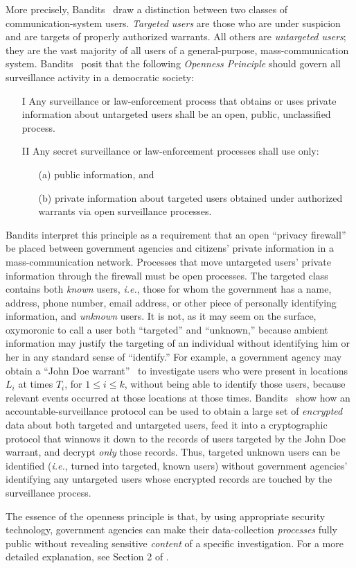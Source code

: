 More precisely, Bandits~\cite{sff-foci2014} draw a distinction 
between two classes of communication-system users.  {\it Targeted users} are 
those who are under suspicion and are targets of properly authorized warrants.
All others are {\it untargeted users}; they are the vast majority of all 
users of a general-purpose, mass-communication system. Bandits~\cite{sff-foci2014}
posit that the following {\it Openness Principle} should govern all surveillance
activity in a democratic society:
\begin{enumerate}
\item[I]
Any surveillance or law-enforcement process
that obtains or uses private information
about untargeted users shall be
an open, public, unclassified process.
\item[II]
Any secret surveillance or law-enforcement processes shall use only:
\begin{enumerate}
\item[(a)] public information, and
\item[(b)] private information about targeted users obtained under 
authorized warrants via open surveillance processes.
\end{enumerate}
\end{enumerate}
Bandits interpret this principle as a requirement that an open
``privacy firewall'' be placed between government agencies and citizens'
private information in a mass-communication network.  Processes that move
untargeted users' private information through the firewall must be open
processes.  The targeted class contains both {\it known} users, {\it i.e.},
those for whom the government has a name, address, phone number, email address,
or other piece of personally identifying information, and {\it unknown} users.
It is not, as it may seem on the surface, oxymoronic to call a user both
``targeted'' and ``unknown,'' because ambient information may justify the
targeting of an individual without identifying him or her in any standard sense
of ``identify.''  For example, a government agency may obtain a ``John Doe
warrant''~\cite{bieber-penn2002} to investigate users who were present in
locations $L_i$ at times $T_i$, for $1\leq i\leq k$, without being able to 
identify those users, because relevant events occurred at those locations at
those times. Bandits~\cite{sff-foci2014} show how an 
accountable-surveillance protocol can be used to obtain a large set of
{\it encrypted} data about both targeted and untargeted users, feed it into a 
cryptographic protocol that winnows it down to the records of users targeted by
the John Doe warrant, and decrypt {\it only} those records.  Thus, targeted
unknown users can be identified ({\it i.e.}, turned into targeted, known users)
without government agencies' identifying any untargeted users whose 
encrypted records are touched by the surveillance process.

The essence of the openness principle is that, by using
appropriate security technology, government agencies can make their 
data-collection {\it processes} fully public without revealing sensitive
{\it content} of a specific investigation.  For a more detailed explanation,
see Section 2 of \cite{sff-foci2014}.

